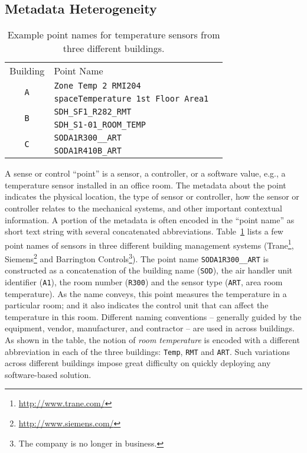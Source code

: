 
\subsection{Metadata Heterogeneity}


\begin{table}[h]
\centering
\begin{tabular}{c|ll}
\cline{1-2}
Building & Point Name & \\
\cline{1-2}
\multirow{2}{*}{\texttt{A}}  & \texttt{Zone Temp 2 RMI204} &  \\
					& \texttt{spaceTemperature 1st Floor Area1} &  \\ \cline{1-2}
\multirow{2}{*}{\texttt{B}} & \texttt{SDH\_SF1\_R282\_RMT} &  \\
                     & \texttt{SDH\_S1-01\_ROOM\_TEMP} &  \\ \cline{1-2}
\multirow{2}{*}{\texttt{C}}  & \texttt{SODA1R300\_\_ART} &  \\
					  & \texttt{SODA1R410B\_ART} &  \\ \cline{1-2}
\end{tabular}
\caption{Example point names for temperature sensors from three different buildings.}
\label{table:ex}
\end{table}


A sense or control ``point'' is a sensor,
a controller, or a software value, e.g., a temperature sensor
installed in an office room. The metadata about the point indicates the physical
location, the type of sensor or controller, how the sensor or controller relates
to the mechanical systems, and other important contextual information. A portion of
the metadata is often encoded in the
``point name'' as short
text string with several concatenated abbreviations. Table~\ref{table:ex} lists 
a few point names of sensors in three different building management systems 
(Trane\footnote{\url{http://www.trane.com/}}, Siemens\footnote{\url{http://www.siemens.com/}} 
and Barrington Controls\footnote{The company is no longer in business.}). 
The point name \texttt{SODA1R300\_\_ART} is constructed as a
concatenation of the building name (\texttt{SOD}), the air handler unit
identifier (\texttt{A1}), the room number (\texttt{R300}) and the sensor type
(\texttt{ART}, area room temperature). As the name conveys, this point measures 
the temperature in a particular room; and it also indicates the control unit that 
can affect the temperature in this room. Different naming conventions -- 
generally guided by the equipment, vendor, manufacturer, 
and contractor --
are used in across buildings. As shown in the table, the notion of {\em room temperature} is encoded 
with a different abbreviation in each of the three buildings: \texttt{Temp}, \texttt{RMT} and \texttt{ART}.
Such variations across different buildings impose great difficulty on quickly deploying any software-based
solution.


